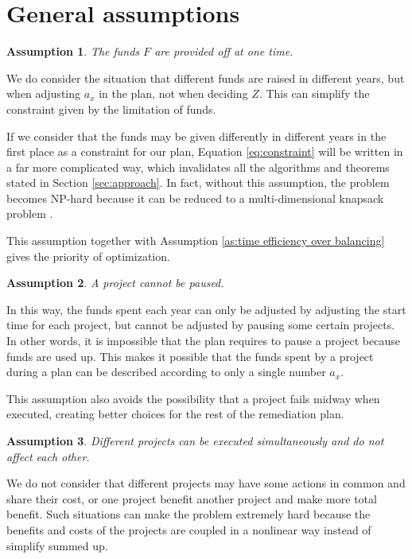 \documentclass{article}
\newtheorem{assumption}{Assumption}
\begin{document}
\section{General assumptions}
\label{sec:assumptions}

\begin{assumption}
\label{as:funds at one time}
The funds $F$ are provided off at one time.
\end{assumption}

We do consider the situation that different funds are raised in different years,
but when adjusting $a_x$ in the plan, not when deciding $Z$.
This can simplify the constraint given by the limitation of funds.

If we consider that the funds may be given differently in different years in the first place as a constraint for our plan,
Equation \ref{eq:constraint} will be written in a far more complicated way, which invalidates all the algorithms and theorems stated in Section \ref{sec:approach}.
In fact, without this assumption, the problem becomes NP-hard because it can be reduced to a multi-dimensional knapsack problem \cite{2dknapsacknp}.

This assumption together with Assumption \ref{as:time efficiency over balancing} gives the priority of optimization.

\begin{assumption}
\label{as:no pause}
A project cannot be paused.
\end{assumption}

In this way, the funds spent each year can only be adjusted by adjusting the start time for each project,
but cannot be adjusted by pausing some certain projects.
In other words, it is impossible that the plan requires to pause a project because funds are used up.
This makes it possible that the funds spent by a project during a plan can be described according to only a single number $a_x$.

This assumption also avoids the possibility that a project fails midway when executed, creating better choices for the rest of the remediation plan.

\begin{assumption}
\label{as:no interrelationship}
Different projects can be executed simultaneously and do not affect each other.
\end{assumption}

We do not consider that different projects may have some actions in common and share their cost, or one project benefit another project and make more total benefit.
Such situations can make the problem extremely hard because the benefits and costs of the projects are coupled in a nonlinear way instead of simplify summed up.
\end{document}
